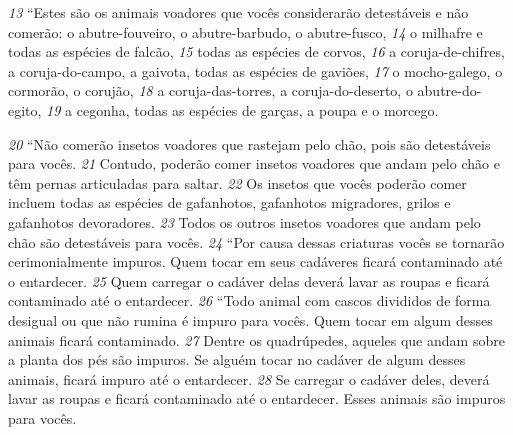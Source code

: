 \smallskip 
\textit{\tiny 13}
“Estes são os animais voadores que vocês considerarão detestáveis e não
comerão: o abutre-fouveiro, o abutre-barbudo, o abutre-fusco, 
\textit{\tiny 14}
o milhafre e
todas as espécies de falcão, 
\textit{\tiny 15}
todas as espécies de corvos, 
\textit{\tiny 16}
a coruja-de-chifres, a
coruja-do-campo, a gaivota, todas as espécies de gaviões, 
\textit{\tiny 17}
o mocho-galego, o
cormorão, o corujão, 
\textit{\tiny 18}
a coruja-das-torres, a coruja-do-deserto, o abutre-do-egito,
\textit{\tiny 19}
a cegonha, todas as espécies de garças, a poupa e o morcego.

\smallskip 
\textit{\tiny 20}
“Não comerão insetos voadores que rastejam pelo chão, pois são detestáveis
para vocês. 
\textit{\tiny 21}
Contudo, poderão comer insetos voadores que andam pelo chão e têm
pernas articuladas para saltar. 
\textit{\tiny 22}
Os insetos que vocês poderão comer incluem
todas as espécies de gafanhotos, gafanhotos migradores, grilos e gafanhotos
devoradores. 
\textit{\tiny 23}
Todos os outros insetos voadores que andam pelo chão são
detestáveis para vocês.
\textit{\tiny 24}
“Por causa dessas criaturas vocês se tornarão cerimonialmente impuros.
Quem tocar em seus cadáveres ficará contaminado até o entardecer. 
\textit{\tiny 25}
Quem
carregar o cadáver delas deverá lavar as roupas e ficará contaminado até o
entardecer.
\textit{\tiny 26}
“Todo animal com cascos divididos de forma desigual ou que não rumina é
impuro para vocês. Quem tocar em algum desses animais ficará contaminado.
\textit{\tiny 27}
Dentre os quadrúpedes, aqueles que andam sobre a planta dos pés são impuros.
Se alguém tocar no cadáver de algum desses animais, ficará impuro até o
entardecer. 
\textit{\tiny 28}
Se carregar o cadáver deles, deverá lavar as roupas e ficará
contaminado até o entardecer. Esses animais são impuros para vocês.
   
